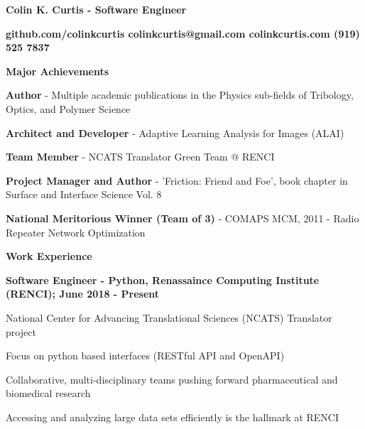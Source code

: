 \documentclass[letterpaper,final]{memoir}
\newcommand{\LargeSep}{\vspace{1.3em}}
\newcommand{\Sep}{\vspace{1.0em}}
\newcommand{\SmallSep}{\vspace{0.4em}}
\newcommand{\CVSection}[1]
	{\LARGE\textbf{#1}\par
	\SmallSep\normalsize}
\newcommand{\CVItem}[1]
	{\textbf{\color{Blue} #1}}
\newcommand\tab[1][1cm]{\hspace*{#1}}
\begin{document}
\Huge \bfseries {\color{Blue} Colin K. Curtis - Software Engineer}

\SmallSep
\normalsize\normalfont

\CVItem  \tab \bfseries {github.com/colinkcurtis \tab colinkcurtis@gmail.com  \tab colinkcurtis.com \tab  (919) 525 7837} 

\Sep





\notoserif \CVSection{Major Achievements}
\normalfont

\Sep

\begin{compactitem}
    
    \item \textbf{Author} - Multiple academic publications in the Physics sub-fields of Tribology, Optics, and Polymer Science
    \SmallSep

    \item \textbf{Architect and Developer} - Adaptive Learning Analysis for Images (ALAI) 
    \SmallSep
    
    \item \textbf{Team Member} - NCATS Translator Green Team @ RENCI
    \SmallSep

    \item \textbf{Project Manager and Author} - 'Friction: Friend and Foe', book chapter in Surface and Interface Science Vol. 8
    \SmallSep
    
    \item \textbf{National Meritorious Winner (Team of 3)} - COMAPS MCM, 2011 - Radio Repeater Network Optimization
	
\end{compactitem}

\LargeSep


\notoserif \CVSection{Work Experience}
\normalfont

\Sep

\CVItem{Software Engineer - Python, Renassaince Computing Institute (RENCI); June 2018 - Present}
\begin{compactitem}[\color{Blue}$\circ$]
    
    \SmallSep

    \item National Center for Advancing Translational Sciences (NCATS) Translator project
    \item Focus on python based interfaces (RESTful API and OpenAPI)
    \item Collaborative, multi-disciplinary teams pushing forward pharmaceutical and biomedical research
    \item Accessing and analyzing large data sets efficiently is the hallmark at RENCI

\end{compactitem}
\end{document}
